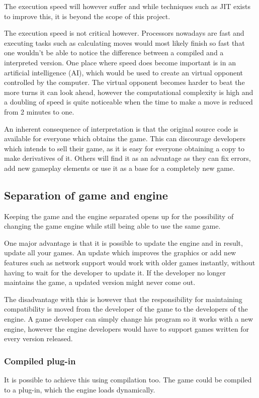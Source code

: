 The execution speed will however suffer and while techniques such as JIT exists to improve this, it is beyond the scope of this project. 

The execution speed is not critical however. 
Processors nowadays are fast and executing tasks such as calculating moves would most likely finish so fast that one wouldn't be able to notice the difference between a compiled and a interpreted version.
One place where speed does become important is in an artificial intelligence (AI), which would be used to create an virtual opponent controlled by the computer. 
The virtual opponent becomes harder to beat the more turns it can look ahead, however the computational complexity is high and a doubling of speed is quite noticeable when the time to make a move is reduced from 2 minutes to one.

An inherent consequence of interpretation is that the original source code is available for everyone which obtains the game. This can discourage developers which intends to sell their game, as it is easy for everyone obtaining a copy to make derivatives of it. Others will find it as an advantage as they can fix errors, add new gameplay elements or use it as a base for a completely new game.

\subsection{Separation of game and engine}
\label{subsec:engineseperation}
Keeping the game and the engine separated opens up for the possibility of changing the game engine while still being able to use the same game. 

One major advantage is that it is possible to update the engine and in result, update all your games.
An update which improves the graphics or add new features such as network support would work with older games instantly, without having to wait for the developer to update it.
If the developer no longer maintains the game, a updated version might never come out.

The disadvantage with this is however that the responsibility for maintaining compatibility is moved from the developer of the game to the developers of the engine. A game developer can simply change his program so it works with a new engine, however the engine developers would have to support games written for every version released.

\subsubsection{Compiled plug-in}
It is possible to achieve this using compilation too.
The game could be compiled to a plug-in, which the engine loads dynamically.

